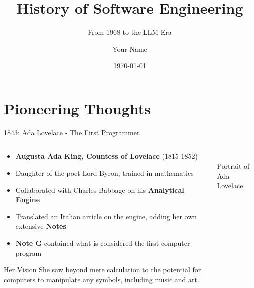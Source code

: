 \documentclass{beamer}
\title{History of Software Engineering}
\subtitle{From 1968 to the LLM Era}
\author{Your Name}
\institute{Your Institution}
\date{\today}
\begin{document}
\frame{\titlepage}

\section{Pioneering Thoughts}

\begin{frame}{1843: Ada Lovelace - The First Programmer}
\begin{columns}
    \begin{column}{0.6\textwidth}
        \begin{itemize}
            \item \textbf{Augusta Ada King, Countess of Lovelace} (1815-1852)
            \item Daughter of the poet Lord Byron, trained in mathematics
            \item Collaborated with Charles Babbage on his \textbf{Analytical Engine}
            \item Translated an Italian article on the engine, adding her own extensive \textbf{Notes}
            \item \textbf{Note G} contained what is considered the first computer program
        \end{itemize}
        \begin{block}{Her Vision}
            She saw beyond mere calculation to the potential for computers to manipulate any symbols, including music and art.
        \end{block}
    \end{column}
    \begin{column}{0.4\textwidth}
        \\\scriptsize{Portrait of Ada Lovelace}
    \end{column}
\end{columns}
\end{frame}
\end{document}
